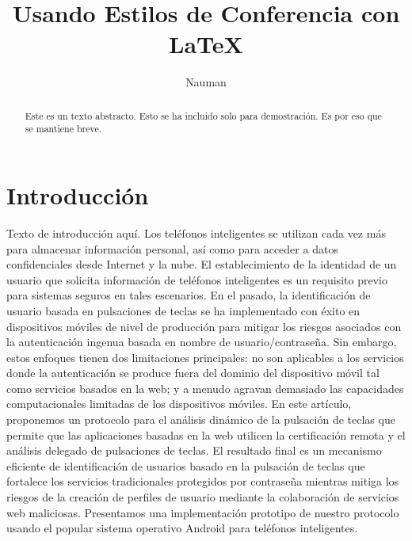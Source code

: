 \documentclass{article}
\begin{document}
	\title{Usando Estilos de Conferencia con \LaTeX}
	\author{Nauman}
	\maketitle
	
	\begin{abstract} 
		Este es un texto abstracto. Esto se ha incluido solo para demostración. Es por eso que se mantiene breve.
	\end{abstract} 
	
	
	\section{Introducción}
	Texto de introducción aquí. Los teléfonos inteligentes se utilizan cada vez más para almacenar información personal, así como para acceder a datos confidenciales desde Internet y la nube. El establecimiento de la identidad de un usuario que solicita información de teléfonos inteligentes es un requisito previo para sistemas seguros en tales escenarios. En el pasado, la identificación de usuario basada en pulsaciones de teclas se ha implementado con éxito en dispositivos móviles de nivel de producción para mitigar los riesgos asociados con la autenticación ingenua basada en nombre de usuario/contraseña. Sin embargo, estos enfoques tienen dos limitaciones principales: no son aplicables a los servicios donde la autenticación se produce fuera del dominio del dispositivo móvil tal como servicios basados en la web; y a menudo agravan demasiado las capacidades computacionales limitadas de los dispositivos móviles. En este artículo, proponemos un protocolo para el análisis dinámico de la pulsación de teclas que permite que las aplicaciones basadas en la web utilicen la certificación remota y el análisis delegado de pulsaciones de teclas. El resultado final es un mecanismo eficiente de identificación de usuarios basado en la pulsación de teclas que fortalece los servicios tradicionales protegidos por 
	contraseña
	mientras mitiga los riesgos de la creación de perfiles de usuario mediante la colaboración de servicios web maliciosas. 
	Presentamos una implementación prototipo de nuestro protocolo usando
	el popular sistema operativo Android para teléfonos inteligentes.
	
\end{document}
